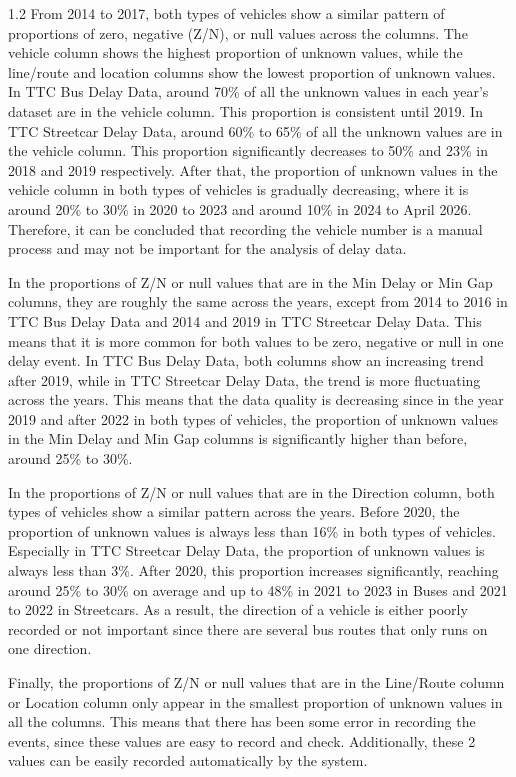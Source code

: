 \documentclass[11pt]{article}
\begin{document}
\begin{spacing}{1.2}
From 2014 to 2017, both types of vehicles show a similar pattern of proportions of zero, negative (Z/N), 
or null values across the columns. The vehicle column shows the highest proportion of unknown values, 
while the line/route and location columns show the lowest proportion of unknown values. In TTC Bus Delay 
Data, around 70\% of all the unknown values in each year's dataset are in the vehicle column. This
proportion is consistent until 2019. In TTC Streetcar Delay Data, around 60\% to 65\% of all the unknown 
values are in the vehicle column. This proportion significantly decreases to 50\% and 23\% in 2018 and 2019 
respectively. After that, the proportion of unknown values in the vehicle column in both types of vehicles
is gradually decreasing, where it is around 20\% to 30\% in 2020 to 2023 and around 10\% in 2024 to April 2026.
Therefore, it can be concluded that recording the vehicle number is a manual process and may not be important
for the analysis of delay data.
\vspace{0.75em}

In the proportions of Z/N or null values that are in the Min Delay or Min Gap columns, they are roughly the 
same across the years, except from 2014 to 2016 in TTC Bus Delay Data and 2014 and 2019 in TTC Streetcar 
Delay Data. This means that it is more common for both values to be zero, negative or null in one delay event.
In TTC Bus Delay Data, both columns show an increasing trend after 2019, while in TTC Streetcar Delay Data, 
the trend is more fluctuating across the years. This means that the data quality is decreasing since in the
year 2019 and after 2022 in both types of vehicles, the proportion of unknown values in the Min Delay 
and Min Gap columns is significantly higher than before, around 25\% to 30\%.
\vspace{0.75em}

In the proportions of Z/N or null values that are in the Direction column, both types of vehicles show
a similar pattern across the years. Before 2020, the proportion of unknown values is always less than 16\%
in both types of vehicles. Especially in TTC Streetcar Delay Data, the proportion of unknown values 
is always less than 3\%. After 2020, this proportion increases significantly, reaching around 25\% to 30\%
on average and up to 48\% in 2021 to 2023 in Buses and 2021 to 2022 in Streetcars. As a result, the direction
of a vehicle is either poorly recorded or not important since there are several bus routes that only runs 
on one direction.
\vspace{0.75em}

Finally, the proportions of Z/N or null values that are in the Line/Route column or Location column
only appear in the smallest proportion of unknown values in all the columns. This means that there has
been some error in recording the events, since these values are easy to record and check. Additionally, 
these 2 values can be easily recorded automatically by the system.
\end{spacing}
\end{document}

